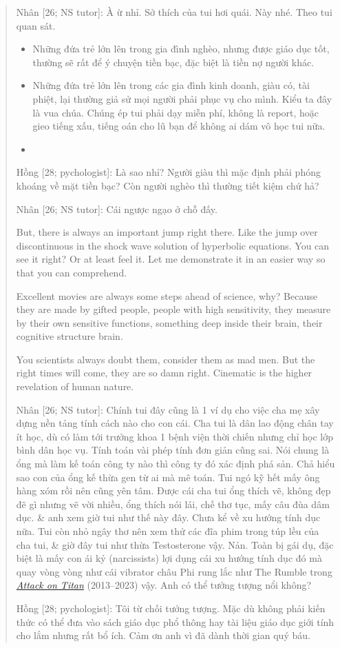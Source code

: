 \documentclass[12pt]{article}
\begin{document}
\begin{quote}
	{\sf Nhân [26; NS tutor]}: À ừ nhỉ. Sở thích của tui hơi quái. Này nhé. Theo tui quan sát.
	\begin{itemize}
		\item Những đứa trẻ lớn lên trong gia đình nghèo, nhưng được giáo dục tốt, thường sẽ rất để ý chuyện tiền bạc, đặc biệt là tiền nợ người khác.
		\item Những đứa trẻ lớn lên trong các gia đình kinh doanh, giàu có, tài phiệt, lại thường giả sử mọi người phải phục vụ cho mình. Kiểu ta đây là vua chúa. Chúng ép tui phải dạy miễn phí, không là report, hoặc gieo tiếng xấu, tiếng oán cho lũ bạn để không ai dám vô học tui nữa.
		\item 
	\end{itemize}
	{\sf Hồng [28; pychologist]}: Là sao nhỉ? Người giàu thì mặc định phải phóng khoáng về mặt tiền bạc? Còn người nghèo thì thường tiết kiệm chứ hả?
	
	{\sf Nhân [26; NS tutor]}: Cái ngược ngạo ở chỗ đấy. 
	
	But, there is always an important jump right there. Like the jump over discontinuous in the shock wave solution of hyperbolic equations. You can see it right? Or at least feel it. Let me demonstrate it in an easier way so that you can comprehend.
	
	Excellent movies are always some steps ahead of science, why? Because they are made by gifted people, people with high sensitivity, they measure by their own sensitive functions, something deep inside their brain, their cognitive structure brain.
	
	You scientists always doubt them, consider them as mad men. But the right times will come, they are so damn right. Cinematic is the higher revelation of human nature.
	
	{\sf Nhân [26; NS tutor]}: Chính tui đây cũng là 1 ví dụ cho việc cha mẹ xây dựng nền tảng tính cách nào cho con cái. Cha tui là dân lao động chân tay ít học, dù có làm tới trưởng khoa 1 bệnh viện thời chiến nhưng chỉ học lớp bình dân học vụ. Tính toán vài phép tính đơn giản cũng sai. Nói chung là ổng mà làm kế toán công ty nào thì công ty đó xác định phá sản. Chả hiểu sao con của ổng kế thừa gen từ ai mà mê toán. Tui ngó kỹ hết mấy ông hàng xóm rồi nên cũng yên tâm. Được cái cha tui ổng thích vẽ, không đẹp đẽ gì nhưng vẽ vời nhiều, ổng thích nói lái, chế thơ tục, mấy câu đùa dâm dục. \& anh xem giờ tui như thế này đây. Chưa kể về xu hướng tính dục nữa. Tui còn nhỏ ngây thơ nên xem thử các đĩa phim trong túp lều của cha tui, \& giờ đây tui như thừa Testosterone vậy. Nản. Toàn bị gái dụ, đặc biệt là mấy con ái kỷ (narcissists) lợi dụng cái xu hướng tính dục đó mà quay vòng vòng như cái vibrator châu Phi rung lắc như The Rumble trong \href{https://www.imdb.com/title/tt2560140}{\it Attack on Titan} (2013--2023) vậy. Anh có thể tưởng tượng nổi không?
		
	{\sf Hồng [28; pychologist]}: Tôi từ chối tưởng tượng. Mặc dù không phải kiến thức có thể đưa vào sách giáo dục phổ thông hay tài liệu giáo dục giới tính cho lắm nhưng rất bổ ích. Cảm ơn anh vì đã dành thời gian quý báu.
\end{quote}
\end{document}
